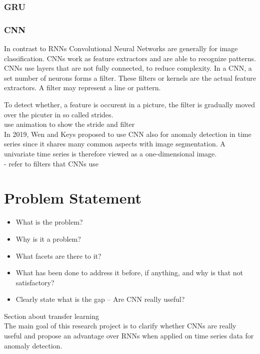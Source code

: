 \subsubsection{GRU}

\subsubsection{CNN}
In contrast to RNNs Convolutional Neural Networks are generally for image classification. CNNs work as feature extractors and are able to recognize patterns. CNNs use layers that are not fully connected, to reduce complexity. In a CNN, a set number of neurons forms a filter. These filters or kernels are the actual feature extractors. A filter may represent a line or pattern.

To detect whether, a feature is occurent in a picture, the filter is gradually moved over the picuter in so called strides.  \\ 

use animation to show the stride and filter\\

In 2019, Wen and Keys proposed to use CNN also for anomaly detection in time series since it shares many common aspects with image segmentation. A univariate time series is therefore viewed as a one-dimensional image.\\ 

- refer to filters that CNNs use


\section{Problem Statement}

\begin{itemize}
	\item  What is the problem?
	\item Why is it a problem?
	\item What facets are there to it?
	\item What has been done to address it before, if anything, and why is
	that not satisfactory?
	\item Clearly state what is the gap -- Are CNN really useful?
\end{itemize}
Section about transfer learning\\

The main goal of this research project is to clarify whether CNNs are really useful and propose an advantage over RNNs when applied on time series data for anomaly detection.


